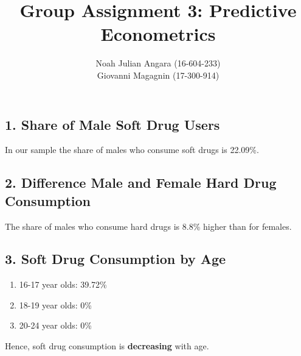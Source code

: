 \documentclass[a4paper,11pt]{article}
\begin{document}
\title{\textbf{Group Assignment 3: Predictive Econometrics}}
\author{Noah Julian Angara (16-604-233)\\
Giovanni Magagnin (17-300-914)}
\maketitle

\subsection*{1. Share of Male Soft Drug Users}
In our sample the share of males who consume soft drugs is 22.09\%.
\subsection*{2. Difference Male and Female Hard Drug Consumption}
The share of males who consume hard drugs is 8.8\% higher than for females.

\subsection*{3. Soft Drug Consumption by Age}
\begin{enumerate}
  \item 16-17 year olds: 39.72\%
  \item 18-19 year olds: 0\%
  \item 20-24 year olds: 0\%
\end{enumerate}

Hence, soft drug consumption is \textbf{decreasing} with age.
\end{document}
